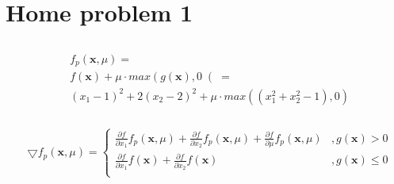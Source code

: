 \documentclass{article}
\begin{document}
\section{Home problem 1}
\subsection{}
\subsubsection{}

\begin{align*}
  &f_\mathit{p}(\mathbf{x}, \mu) = \\
  &f(\mathbf{x}) + \mu \cdot max \left( g(\mathbf{x}), 0 \right(  = \\
  &(x_1 - 1)^2 + 2(x_2 - 2)^2 + \mu \cdot max \left( (x_1^2 + x_2^2 - 1 ), 0 \right)
\end{align*}

\subsubsection{}

\begin{align*}
  & \bigtriangledown f_\mathit{p}(\mathbf{x}, \mu) =
  \begin{cases}
    \frac{\partial f}{\partial x_1}f_\mathit{p}(\mathbf{x}, \mu) + \frac{\partial f}{\partial x_2}f_\mathit{p}(\mathbf{x}, \mu) + \frac{\partial f}{\partial \mu}f_\mathit{p}(\mathbf{x}, \mu) &,g(\mathbf{x}) > 0 \\
    \frac{\partial f}{\partial x_1}f(\mathbf{x}) + \frac{\partial f}{\partial x_2}f(\mathbf{x}) &, g(\mathbf{x}) \leq 0 \\
  \end{cases}
\end{align*}

\subsection{}

\subsection{}
\end{document}
